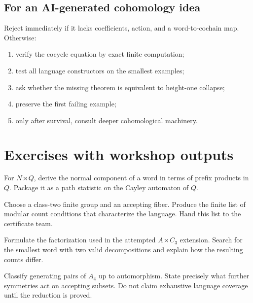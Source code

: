 \documentclass{amsart}
\begin{document}
\subsection{For an AI-generated cohomology idea}

Reject immediately if it lacks coefficients, action, and a word-to-cochain map.  Otherwise:
\begin{enumerate}
  \item verify the cocycle equation by exact finite computation;
  \item test all language constructors on the smallest examples;
  \item ask whether the missing theorem is equivalent to height-one collapse;
  \item preserve the first failing example;
  \item only after survival, consult deeper cohomological machinery.
\end{enumerate}

\section{Exercises with workshop outputs}

\begin{exercise}
For $N\rtimes Q$, derive the normal component of a word in terms of prefix products in $Q$.  Package it as a path statistic on the Cayley automaton of $Q$.
\end{exercise}

\begin{exercise}
Choose a class-two finite group and an accepting fiber.  Produce the finite list of modular count conditions that characterize the language.  Hand this list to the certificate team.
\end{exercise}

\begin{exercise}[$C_3$ ambiguity]
Formulate the factorization used in the attempted $A\rtimes C_3$ extension.  Search for the smallest word with two valid decompositions and explain how the resulting counts differ.
\end{exercise}

\begin{exercise}
Classify generating pairs of $A_4$ up to automorphism.  State precisely what further symmetries act on accepting subsets.  Do not claim exhaustive language coverage until the reduction is proved.
\end{exercise}
\end{document}
